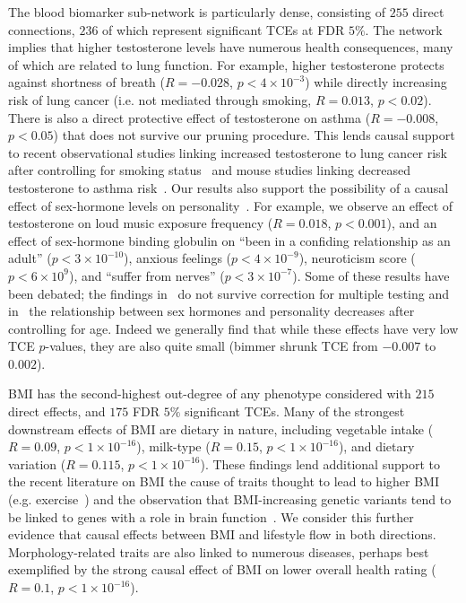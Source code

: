 \documentclass{article}
\begin{document}
The blood biomarker sub-network is particularly dense,
consisting of $255$ direct connections, $236$ of which represent
significant TCEs at FDR $5\%$.
The network implies that higher testosterone levels have numerous health consequences, many of
which are related to lung function. For example, higher testosterone protects against
shortness of breath ($R = -0.028$, $p < 4\times 10^{-3}$)
while directly increasing risk of lung cancer (i.e. not mediated through smoking, $R = 0.013$, $p < 0.02$).
There is also a direct protective effect of testosterone on asthma ($R = -0.008$, $p < 0.05$) that
does not survive our pruning procedure. This lends causal support to
recent observational studies linking increased testosterone to lung cancer risk after controlling
for smoking status~\cite{Hyde2012}
and mouse studies linking decreased testosterone to asthma risk~\cite{Cephus2017}.
Our results also support the possibility of a causal effect of sex-hormone
levels on personality~\cite{Colangelo2012,Asselmann2019,Ekholm2014,Aluja2014}.
For example, we observe an effect of testosterone on loud
music exposure frequency ($R = 0.018$, $p < 0.001$), and
an effect of sex-hormone binding globulin on
``been in a confiding relationship as an adult'' ($p < 3 \times 10^{-10}$),
 anxious feelings ($p<4\times 10^{-9}$), neuroticism score ($p<6\times 10^{9}$), and ``suffer from nerves''
($p < 3\times 10^{-7}$). Some of these results have been debated;
 the findings in~\cite{Asselmann2019} do not survive correction for multiple testing and
in~\cite{Aluja2014} the relationship between sex hormones and personality decreases after controlling
for age. Indeed we generally find that while these effects have very low TCE $p$-values, they 
are also quite small (bimmer shrunk TCE from $-0.007$ to $0.002$).

BMI has the second-highest out-degree of any phenotype considered with
$215$ direct effects, and $175$ FDR $5\%$ significant TCEs.
Many of the strongest downstream effects of BMI are dietary
in nature, including vegetable intake ($R = 0.09$, $p < 1\times 10^{-16}$),
milk-type ($R = 0.15$, $p < 1\times 10^{-16}$), and dietary variation ($R = 0.115$, $p < 1\times 10^{-16}$).
These findings lend additional support to the recent literature on BMI the cause of
traits thought to lead to higher BMI (e.g. exercise~\cite{Richmond2014}) and the observation that
BMI-increasing genetic variants tend to be linked to genes with a role in brain
function~\cite{Locke2015,Zhu2016,Ndiaye2020}. We consider this further evidence that causal effects between
BMI and lifestyle flow in both directions.
Morphology-related traits are also linked
to numerous diseases, perhaps best exemplified by the strong causal effect of BMI on lower overall
health rating ($R = 0.1$, $p < 1 \times 10^{-16}$).
\end{document}
